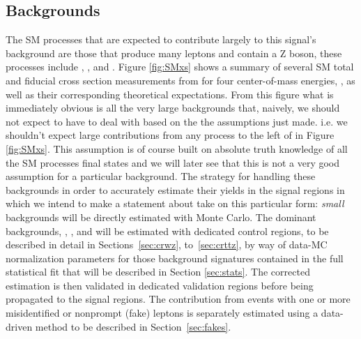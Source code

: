 \subsection{Backgrounds}
\label{sec:strategy:background}
The SM processes that are expected to contribute largely to this signal's background are those that produce many leptons and contain a Z boson, these processes include \WZ, \ZZ, and \ttZ.
Figure \ref{fig:SMxs} shows a summary of several SM total and fiducial cross section measurements from \atlas for four center-of-mass energies, \rts, as well as their corresponding theoretical expectations. 
From this figure what is immediately obvious is all the very large backgrounds that, naively, we should not expect to have to deal with based on the the assumptions just made.
i.e. we shouldn't expect large contributions from any process to the left of \VV in Figure \ref{fig:SMxs}.
This assumption is of course built on absolute truth knowledge of all the SM processes final states and we will later see that this is not a very good assumption for a particular background. 
The strategy for handling these backgrounds in order to accurately estimate their yields in the signal regions in which we intend to make a statement about take on this particular form: \emph{small} backgrounds will be directly estimated with Monte Carlo.
The dominant backgrounds, \WZ, \ZZ, and \ttZ will be estimated with dedicated control regions, to be described in detail in Sections~\ref{sec:crwz}, to~\ref{sec:crttz}, by way of data-MC normalization parameters for those background signatures contained in the full statistical fit that will be described in Section \ref{sec:stats}.
The corrected estimation is then validated in dedicated validation regions before being propagated to the signal regions. 
The contribution from events with one or more misidentified or nonprompt (fake) leptons is separately estimated using a data-driven method to be described in Section~\ref{sec:fakes}.

